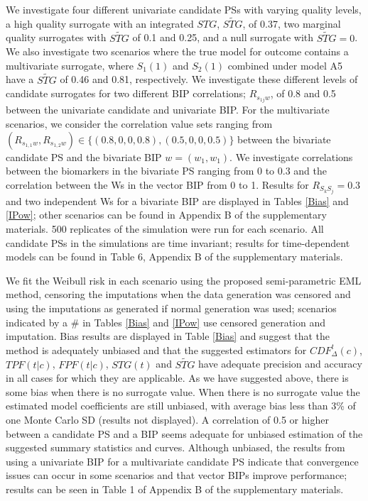 \documentclass[times, doublespace]{simauth}
\begin{document}
We investigate four different univariate candidate PSs with varying quality levels, a high quality surrogate with an integrated $STG$, $\widetilde{STG}$, of 0.37, two marginal quality surrogates with $\widetilde{STG}$ of 0.1 and 0.25, and a null surrogate with $\widetilde{STG} = 0$. We also investigate two scenarios where the true model for outcome contains a multivariate surrogate, where $S_1(1)$ and $S_2(1)$ combined under model A5 have a $\widetilde{STG}$ of 0.46 and 0.81, respectively. We investigate these different levels of candidate surrogates for two different BIP correlations; $R_{s_{1j}w}$, of 0.8 and 0.5 between the univariate candidate and univariate BIP. For the multivariate scenarios, we consider the correlation value sets ranging from $(R_{s_{1,1}w},R_{s_{1,2}w})\in\{(0.8,0,0,0.8), (0.5,0,0,0.5)\}$ between the bivariate candidate PS and the bivariate BIP $w=(w_1, w_1)$. We investigate correlations between the biomarkers in the bivariate PS ranging from 0 to 0.3 and the correlation between the Ws in the vector BIP from 0 to 1. Results for $R_{S_kS_j}=0.3$ and two independent Ws for a bivariate BIP are displayed in Tables \ref{Bias} and \ref{IPow}; other scenarios can be found in Appendix B of the supplementary materials. 500 replicates of the simulation were run for each scenario. All candidate PSs in the simulations are time invariant; results for time-dependent models can be found in Table 6, Appendix B of the supplementary materials.  

We fit the Weibull risk in each scenario using the proposed semi-parametric EML method, censoring the imputations when the data generation was censored and using the imputations as generated if normal generation was used; scenarios indicated by a $\#$ in Tables \ref{Bias} and \ref{IPow} use censored generation and imputation. Bias results are displayed in Table \ref{Bias} and suggest that the method is adequately unbiased and that the suggested estimators for $CDF^{t}_{\Delta}(c)$, $TPF(t|c)$, $FPF(t|c)$, $STG(t)$ and $\widetilde{STG}$ have adequate precision and accuracy in all cases for which they are applicable. As we have suggested above, there is some bias when there is no surrogate value. When there is no surrogate value the estimated model coefficients are still unbiased, with average bias less than 3\% of one Monte Carlo SD (results not displayed). A correlation of 0.5 or higher between a candidate PS and a BIP seems adequate for unbiased estimation of the suggested summary statistics and curves. Although unbiased, the results from using a univariate BIP for a multivariate candidate PS indicate that convergence issues can occur in some scenarios and that vector BIPs improve performance; results can be seen in Table 1 of Appendix B of the supplementary materials. 
\end{document}
